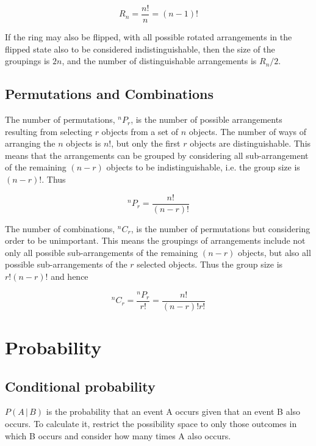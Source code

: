 \documentclass[a5paper]{article}
\begin{document}
\begin{equation}
  R_n = \frac{n!}{n} = (n-1)!
\end{equation}

If the ring may also be flipped, with all possible rotated arrangements in the
flipped state also to be considered indistinguishable, then the size of the
groupings is $2n$, and the number of distinguishable arrangements is $R_n / 2$.

\subsection{Permutations and Combinations}

The number of permutations, ${}^nP_r$, is the number of possible arrangements
resulting from selecting $r$ objects from a set of $n$ objects. The number of
ways of arranging the $n$ objects is $n!$, but only the first $r$ objects are
distinguishable. This means that the arrangements can be grouped by
considering all sub-arrangement of the remaining $(n-r)$ objects to be
indistinguishable, i.e. the group size is $(n-r)!$. Thus

\begin{equation}
  {}^nP_r = \frac{n!}{(n-r)!}
\end{equation}

The number of combinations, ${}^nC_r$, is the number of permutations but
considering order to be unimportant. This means the groupings of arrangements
include not only all possible sub-arrangements of the remaining $(n-r)$ objects,
but also all possible sub-arrangements of the $r$ selected objects. Thus the
group size is $r!(n-r)!$ and hence

\begin{equation}
  {}^nC_r = \frac{{}^nP_r}{r!} = \frac{n!}{(n-r)!r!}
\end{equation}

\section{Probability}
\subsection{Conditional probability}

$P(A\,|\,B)$ is the probability that an event A occurs given that an event B also
occurs. To calculate it, restrict the possibility space to only those outcomes
in which B occurs and consider how many times A also occurs.
\end{document}
